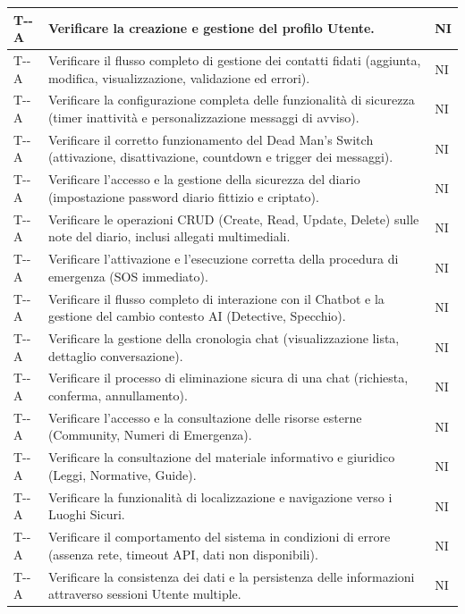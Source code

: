 \documentclass[a4paper,12pt]{article}
\newcounter{testacc}
\newcommand{\acctestcode}{T-\arabic{testacc}-A}
\newcommand{\ignoreglossary}{}
\begin{document}
\begin{longtable}{| >{\centering\arraybackslash}p{} | >{\raggedright\arraybackslash}p{} | >{\centering\arraybackslash}p{} |}
\stepcounter{testacc} \acctestcode & Verificare la creazione e gestione del profilo Utente. & NI \\
\hline
\stepcounter{testacc} \acctestcode & Verificare il flusso completo di gestione dei contatti fidati (aggiunta, modifica, visualizzazione, \ignoreglossary{validazione} ed errori). & NI \\
\hline
\stepcounter{testacc} \acctestcode & Verificare la configurazione completa delle funzionalità di sicurezza (timer inattività e personalizzazione messaggi di avviso). & NI \\
\hline
\stepcounter{testacc} \acctestcode & Verificare il corretto funzionamento del Dead Man's Switch (attivazione, disattivazione, countdown e trigger dei messaggi). & NI \\
\hline
\stepcounter{testacc} \acctestcode & Verificare l'accesso e la gestione della sicurezza del diario (impostazione password diario fittizio e criptato). & NI \\
\hline
\stepcounter{testacc} \acctestcode & Verificare le operazioni CRUD (Create, Read, Update, Delete) sulle note del diario, inclusi allegati multimediali. & NI \\
\hline
\stepcounter{testacc} \acctestcode & Verificare l'attivazione e l'esecuzione corretta della procedura di emergenza (SOS immediato). & NI \\
\hline
\stepcounter{testacc} \acctestcode & Verificare il flusso completo di interazione con il Chatbot e la gestione del cambio contesto AI (Detective, Specchio). & NI \\
\hline
\stepcounter{testacc} \acctestcode & Verificare la gestione della cronologia chat (visualizzazione lista, dettaglio conversazione). & NI \\
\hline
\stepcounter{testacc} \acctestcode & Verificare il \ignoreglossary{processo} di eliminazione sicura di una chat (richiesta, conferma, annullamento). & NI \\
\hline
\stepcounter{testacc} \acctestcode & Verificare l'accesso e la consultazione delle risorse esterne (Community, Numeri di Emergenza). & NI \\
\hline
\stepcounter{testacc} \acctestcode & Verificare la consultazione del materiale informativo e giuridico (Leggi, Normative, Guide). & NI \\
\hline
\stepcounter{testacc} \acctestcode & Verificare la funzionalità di localizzazione e navigazione verso i Luoghi Sicuri. & NI \\
\hline
\stepcounter{testacc} \acctestcode & Verificare il comportamento del sistema in condizioni di errore (assenza rete, timeout API, dati non disponibili). & NI \\
\hline
\stepcounter{testacc} \acctestcode & Verificare la consistenza dei dati e la persistenza delle informazioni attraverso sessioni Utente multiple. & NI \\
\hline
\end{longtable}
\endgroup
\end{document}
